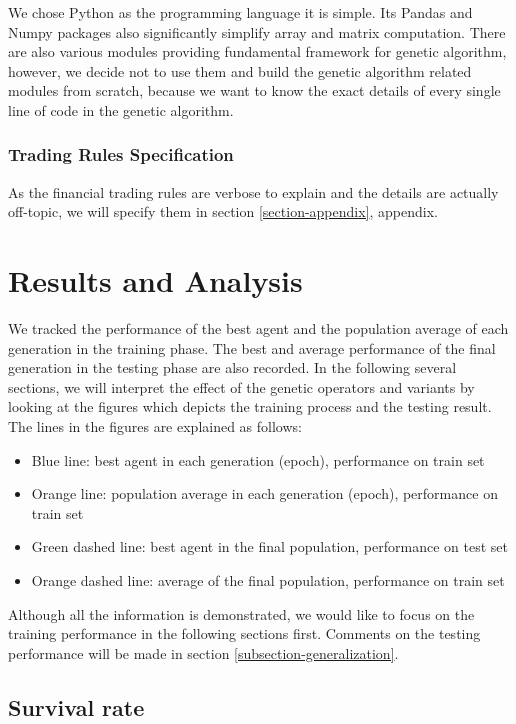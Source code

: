 \documentclass{article}
\begin{document}
We chose Python as the programming language it is simple.
Its Pandas and Numpy packages also significantly simplify array and matrix computation.
There are also various modules providing fundamental framework for genetic algorithm,
however, we decide not to use them and build the genetic algorithm related modules from scratch,
because we want to know the exact details of every single line of code
in the genetic algorithm.

\subsubsection{Trading Rules Specification}

As the financial trading rules are verbose to explain and the details are actually off-topic,
we will specify them in section \ref{section-appendix}, appendix.

\section{Results and Analysis}

We tracked the performance of the best agent and
the population average of each generation in the training phase.
The best and average performance of the final generation in the testing phase are also recorded.
In the following several sections,
we will interpret the effect of the genetic operators and variants
by looking at the figures which depicts the training process and the testing result.
The lines in the figures are explained as follows:
\begin{itemize}
	\item Blue line: best agent in each generation (epoch), performance on train set
	\item Orange line: population average in each generation (epoch), performance on train set
	\item Green dashed line: best agent in the final population, performance on test set
	\item Orange dashed line: average of the final population, performance on train set
\end{itemize}

Although all the information is demonstrated,
we would like to focus on the training performance in the following sections first.
Comments on the testing performance will be made in section \ref{subsection-generalization}.

\subsection{Survival rate}
\end{document}
